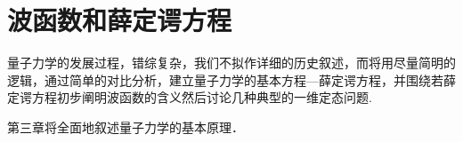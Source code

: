 \chapter{波函数和薛定谔方程}\label{chp:02} %

量子力学的发展过程，错综复杂，我们不拟作详细的历史叙述，而将用尽量简明的逻辑，通过简单的对比分析，建立量子力学的基本方程—薛定谔方程，并围绕若薛定谔方程初步阐明波函数的含义然后讨论几种典型的一维定态问题.

第三章将全面地叙述量子力学的基本原理．














